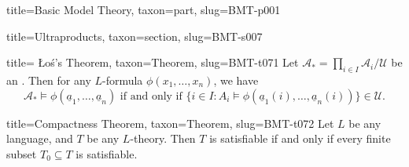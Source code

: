 \documentclass[a4paper]{article}
\begin{document}
\begin{tree}{title={Basic Model Theory}, taxon={part}, slug={BMT-p001}}
\begin{tree}{title={Ultraproducts}, taxon={section}, slug={BMT-s007}}
\begin{tree}{title={ Łoś's Theorem}, taxon={Theorem}, slug={BMT-t071}}
Let \(\mathcal {A}_* =  \prod \limits _{i \in  I}  \mathcal {A}_i /  \mathcal {U}\) be an . Then for any \(L\)-formula \(\phi (x_1, \dots ,x_n)\), we have \[\mathcal {A}_* \models   \phi ( \underline {a}_1, \dots , \underline {a}_n)  \text { if and only if }  \{ i \in  I: A_i \models \phi ( \underline {a}_1(i), \dots ,  \underline {a}_n(i)) \} \in \mathcal {U}.\]
\end{tree}

\begin{tree}{title={Compactness Theorem}, taxon={Theorem}, slug={BMT-t072}}
Let \(L\) be any language, and \(T\) be any \(L\)-theory. Then \(T\) is satisfiable if and only if every finite subset \(T_0 \subseteq  T\) is satisfiable.
\end{tree}

\end{tree}


  
  

\end{tree}
\end{document}
